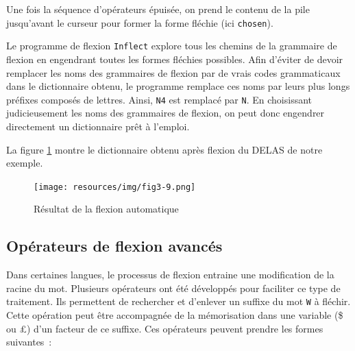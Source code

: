 \bigskip
\noindent Une fois la séquence d’opérateurs épuisée, on prend le contenu de la pile jusqu’avant le
curseur pour former la forme fléchie (ici \verb+chosen+).

\bigskip
\noindent Le programme de flexion \verb+Inflect+ explore tous les chemins de la grammaire de flexion
en engendrant toutes les formes fléchies possibles. Afin d’éviter de devoir remplacer les noms des
grammaires de flexion par de vrais codes grammaticaux dans le dictionnaire obtenu, le programme
remplace ces noms par leurs plus longs préfixes composés de lettres. Ainsi, \verb+N4+ est remplacé
par \verb+N+. En choisissant judicieusement les noms des grammaires de flexion, on peut donc
engendrer directement un dictionnaire prêt à l’emploi.

\bigskip
\noindent La figure \ref{fig-inflection-result} montre le dictionnaire obtenu après flexion du DELAS de notre exemple.

\bigskip
\begin{figure}[!ht]
\begin{center}
\texttt{[image: resources/img/fig3-9.png]}
\caption{Résultat de la flexion automatique\label{fig-inflection-result}}
\end{center}
\end{figure}
\bigskip

\subsection{Opérateurs de flexion avancés}
\label{advanced-inflection-operators}
Dans certaines langues, le processus de flexion entraine une modification de la racine du mot.
Plusieurs opérateurs ont été développés pour faciliter ce type de traitement. Ils permettent de rechercher
et d'enlever un suffixe du mot \verb+W+ \`a fléchir. Cette opération peut
\^etre accompagnée de la mémorisation dans une variable (\$ ou \pounds) d'un facteur de ce suffixe.
Ces opérateurs peuvent prendre les formes suivantes~:

